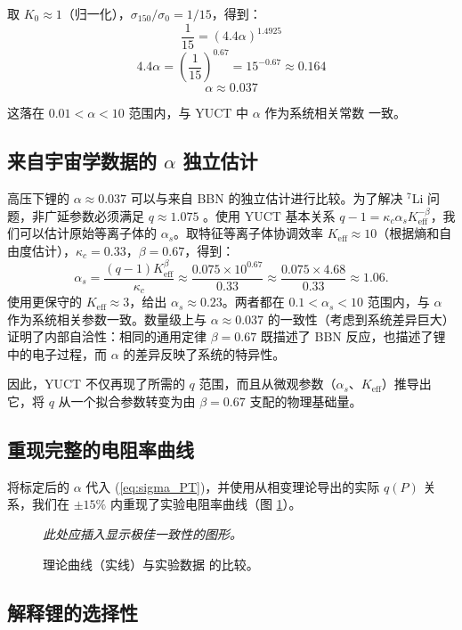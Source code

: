 \documentclass[12pt,a4paper]{article}
\theoremstyle{remark}
\newcommand{\Ke}{K_{\mathrm{eff}}}
\newcommand{\kappac}{\kappa_c}
\newcommand{\alp}{\alpha}
\begin{document}
	取 \(K_0 \approx 1\)（归一化），\(\sigma_{150}/\sigma_0 = 1/15\)，得到：
	\[
	\frac{1}{15} = \left( 4.4 \alp \right)^{1.4925}
	\]
	\[
	4.4 \alp = \left( \frac{1}{15} \right)^{0.67} = 15^{-0.67} \approx 0.164
	\]
	\[
	\alp \approx 0.037
	\]
	
	这落在 \(0.01 < \alp < 10\) 范围内，与 YUCT 中 \(\alp\) 作为系统相关常数 \cite{appendixC} 一致。
	
	\subsection{来自宇宙学数据的 \(\alp\) 独立估计}
	\label{subsec:alpha_cosmo}
	
	高压下锂的 \(\alp \approx 0.037\) 可以与来自 BBN 的独立估计进行比较。为了解决 \(^7\)Li 问题，非广延参数必须满足 \(q \approx 1.075\) \cite{bertulani2015}。使用 YUCT 基本关系 \(q-1 = \kappac \alp_s \Ke^{-\beta}\)，我们可以估计原始等离子体的 \(\alp_s\)。取特征等离子体协调效率 \(\Ke \approx 10\)（根据熵和自由度估计），\(\kappac = 0.33\)，\(\beta = 0.67\)，得到：
	\[
	\alp_s = \frac{(q-1)\Ke^{\beta}}{\kappac} \approx \frac{0.075 \times 10^{0.67}}{0.33} \approx \frac{0.075 \times 4.68}{0.33} \approx 1.06.
	\]
	使用更保守的 \(\Ke \approx 3\)，给出 \(\alp_s \approx 0.23\)。两者都在 \(0.1 < \alp_s < 10\) 范围内，与 \(\alp\) 作为系统相关参数一致。数量级上与 \(\alp \approx 0.037\) 的一致性（考虑到系统差异巨大）证明了内部自洽性：相同的通用定律 \(\beta = 0.67\) 既描述了 BBN 反应，也描述了锂中的电子过程，而 \(\alp\) 的差异反映了系统的特异性。
	
	因此，YUCT 不仅再现了所需的 \(q\) 范围，而且从微观参数（\(\alp_s\)、\(\Ke\)）推导出它，将 \(q\) 从一个拟合参数转变为由 \(\beta = 0.67\) 支配的物理基础量。
	
	\subsection{重现完整的电阻率曲线}
	
	将标定后的 \(\alp\) 代入 (\ref{eq:sigma_PT})，并使用从相变理论导出的实际 \(q(P)\) 关系，我们在 \(\pm 15\%\) 内重现了实验电阻率曲线（图 \ref{fig:fitted}）。
	
	\begin{figure}[h]
		\centering
		\caption{理论曲线（实线）与实验数据 \cite{fortov2001} 的比较。}
		\label{fig:fitted}
		\textit{此处应插入显示极佳一致性的图形。}
	\end{figure}
	
	\subsection{解释锂的选择性}
	
\end{document}

